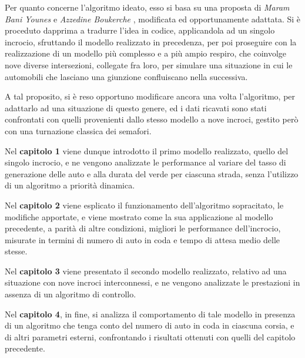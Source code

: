 Per quanto concerne l’algoritmo ideato, esso si basa su una proposta di \textit{Maram Bani Younes} e \textit{Azzedine Boukerche} \cite{itlc}, modificata ed opportunamente adattata. Si è proceduto dapprima a tradurre l’idea in codice, applicandola ad un singolo incrocio, sfruttando il modello realizzato in precedenza, per poi proseguire con la realizzazione di un modello più complesso e a più ampio respiro, che coinvolge nove diverse intersezioni, collegate fra loro, per simulare una situazione in cui le automobili che lasciano una giunzione confluiscano nella successiva.

A tal proposito, si è reso opportuno modificare ancora una volta l’algoritmo, per adattarlo ad una situazione di questo genere, ed i dati ricavati sono stati confrontati con quelli provenienti dallo stesso modello a nove incroci, gestito però con una turnazione classica dei semafori.

Nel \textbf{capitolo 1} viene dunque introdotto il primo modello realizzato, quello del singolo incrocio, e ne vengono analizzate le performance al variare del tasso di generazione delle auto e alla durata del verde per ciascuna strada, senza l’utilizzo di un algoritmo a priorità dinamica.

Nel \textbf{capitolo 2} viene esplicato il funzionamento dell’algoritmo sopracitato, le modifiche apportate, e viene mostrato come la sua applicazione al modello precedente, a parità di altre condizioni, migliori le performance dell’incrocio, misurate in termini di numero di auto in coda e tempo di attesa medio delle stesse.

Nel \textbf{capitolo 3} viene presentato il secondo modello realizzato, relativo ad una situazione con nove incroci interconnessi, e ne vengono analizzate le prestazioni in assenza di un algoritmo di controllo.

Nel \textbf{capitolo 4}, in fine, si analizza il comportamento di tale modello in presenza di un algoritmo che tenga conto del numero di auto in coda in ciascuna corsia, e di altri parametri esterni, confrontando i risultati ottenuti con quelli del capitolo precedente.


